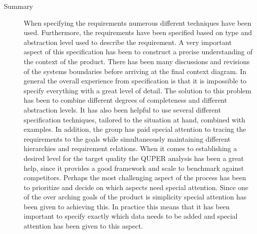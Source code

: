 \documentclass[10pt,a4paper]{article}
\begin{document}
\begin{description}
\item[Summary] When specifying the requirements numerous different techniques have been used. Furthermore, the requirements have been specified based on type and abstraction level used to describe the requirement. A very important aspect of this specification has been to construct a precise understanding of the context of the product. There has been many discussions and revisions of the systems boundaries before arriving at the final context diagram. In general the overall experience from specification is that it is impossible to specify everything with a great level of detail. The solution to this problem has been to combine different degrees of completeness and different abstraction levels. It has also been helpful to use several different specification techniques, tailored to the situation at hand, combined with examples. In addition, the group has paid special attention to tracing the requirements to the goals while simultaneously maintaining different hierarchies and requirement relations. When it comes to establishing a desired level for the target quality the QUPER analysis has been a great help, since it provides a good framework and scale to benchmark against competitors. 
 Perhaps the most challenging aspect of the process has been to prioritize and decide on which aspects need special attention. Since one of the over arching goals of the product is simplicity special attention has been given to achieving this. In practice this means that it has been important to specify exactly which data needs to be added and special attention has been given to this aspect. 


\end{description}


\end{document}
